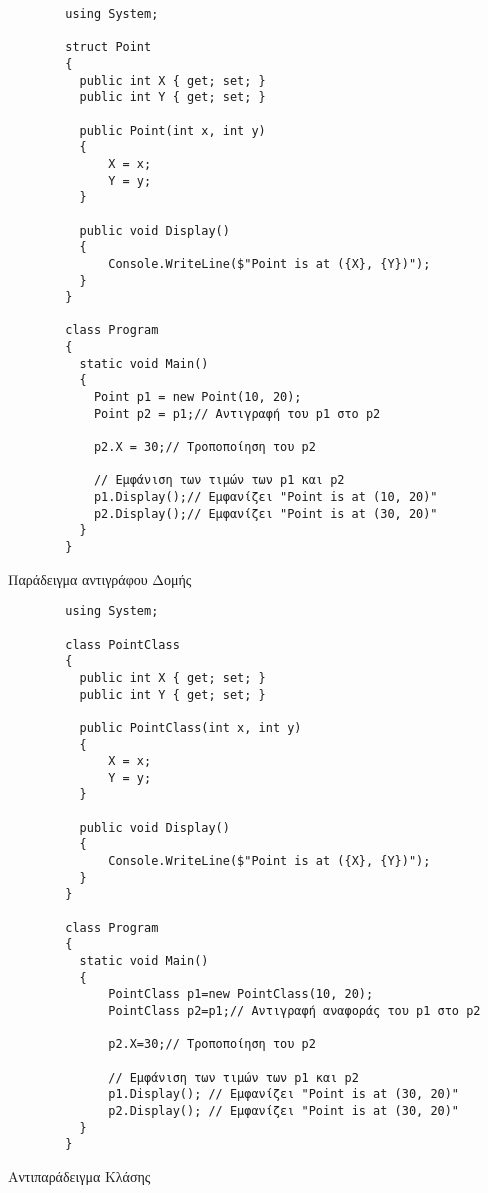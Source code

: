 \begin{listing}[H]
    \begin{verbatim}
        using System;

        struct Point
        {
          public int X { get; set; }
          public int Y { get; set; }
        
          public Point(int x, int y)
          {
              X = x;
              Y = y;
          }
        
          public void Display()
          {
              Console.WriteLine($"Point is at ({X}, {Y})");
          }
        }
        
        class Program
        {
          static void Main()
          {
            Point p1 = new Point(10, 20);
            Point p2 = p1;// Αντιγραφή του p1 στο p2

            p2.X = 30;// Τροποποίηση του p2

            // Εμφάνιση των τιμών των p1 και p2
            p1.Display();// Εμφανίζει "Point is at (10, 20)"
            p2.Display();// Εμφανίζει "Point is at (30, 20)"
          }
        }
    \end{verbatim}
\caption{Παράδειγμα αντιγράφου Δομής}
\label{flagExec}
\end{listing}

\begin{listing}[H]
    \begin{verbatim}
        using System;

        class PointClass
        {
          public int X { get; set; }
          public int Y { get; set; }
        
          public PointClass(int x, int y)
          {
              X = x;
              Y = y;
          }
        
          public void Display()
          {
              Console.WriteLine($"Point is at ({X}, {Y})");
          }
        }
        
        class Program
        {
          static void Main()
          {
              PointClass p1=new PointClass(10, 20);
              PointClass p2=p1;// Αντιγραφή αναφοράς του p1 στο p2
        
              p2.X=30;// Τροποποίηση του p2
        
              // Εμφάνιση των τιμών των p1 και p2
              p1.Display(); // Εμφανίζει "Point is at (30, 20)"
              p2.Display(); // Εμφανίζει "Point is at (30, 20)"
          }
        }
    \end{verbatim}
\caption{Αντιπαράδειγμα Κλάσης}
\label{flagExec}
\end{listing}